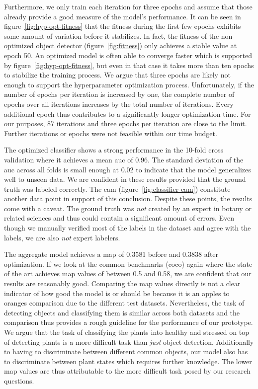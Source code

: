 \documentclass[draft,final]{vutinfth} %
\begin{document}
Furthermore, we only train each iteration for three epochs and assume
that those already provide a good measure of the model's
performance. It can be seen in figure~\ref{fig:hyp-opt-fitness} that
the fitness during the first few epochs exhibits some amount of
variation before it stabilizes. In fact, the fitness of the
non-optimized object detector (figure~\ref{fig:fitness}) only achieves
a stable value at epoch \num{50}. An optimized model is often able to
converge faster which is supported by
figure~\ref{fig:hyp-opt-fitness}, but even in that case it takes more
than ten epochs to stabilize the training process. We argue that three
epochs are likely not enough to support the hyperparameter
optimization process. Unfortunately, if the number of epochs per
iteration is increased by one, the complete number of epochs over all
iterations increases by the total number of iterations. Every
additional epoch thus contributes to a significantly longer
optimization time. For our purposes, \num{87} iterations and three
epochs per iteration are close to the limit. Further iterations or
epochs were not feasible within our time budget.

The optimized classifier shows a strong performance in the
\num{10}-fold cross validation where it achieves a mean \gls{auc} of
\num{0.96}. The standard deviation of the \gls{auc} across all folds
is small enough at \num{0.02} to indicate that the model generalizes
well to unseen data. We are confident in these results provided that
the ground truth was labeled correctly. The \gls{cam}
(figure~\ref{fig:classifier-cam}) constitute another data point in
support of this conclusion. Despite these points, the results come
with a caveat. The ground truth was \emph{not} created by an expert in
botany or related sciences and thus could contain a significant amount
of errors. Even though we manually verified most of the labels in the
dataset and agree with the labels, we are also \emph{not} expert
labelers.

The aggregate model achieves a \gls{map} of \num{0.3581} before and
\num{0.3838} after optimization. If we look at the common benchmarks
(\gls{coco}) again where the state of the art achieves \gls{map}
values of between \num{0.5} and \num{0.58}, we are confident that our
results are reasonably good. Comparing the \gls{map} values directly
is not a clear indicator of how good the model is or should be because
it is an apples to oranges comparison due to the different test
datasets. Nevertheless, the task of detecting objects and classifying
them is similar across both datasets and the comparison thus provides
a rough guideline for the performance of our prototype. We argue that
the task of classifying the plants into healthy and stressed on top of
detecting plants is a more difficult task than \emph{just} object
detection. Additionally to having to discriminate between different
common objects, our model also has to discriminate between plant
states which requires further knowledge. The lower \gls{map} values
are thus attributable to the more difficult task posed by our research
questions.
\end{document}
